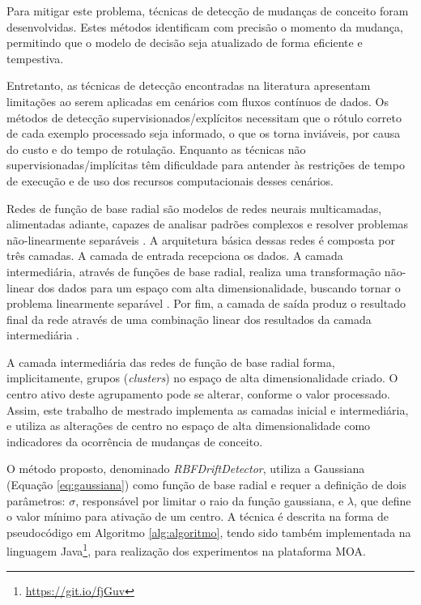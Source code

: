 \documentclass[qual, classic, a4paper]{ufbathesis}
\begin{document}
Para mitigar este problema, técnicas de detecção de mudanças de conceito foram desenvolvidas. 
Estes métodos identificam com precisão o momento da mudança, permitindo que o modelo de decisão seja atualizado de forma eficiente e tempestiva.

Entretanto, as técnicas de detecção encontradas na literatura apresentam limitações ao serem aplicadas em cenários com fluxos contínuos de dados.
Os métodos de detecção supervisionados/explícitos necessitam que o rótulo correto de cada exemplo processado seja informado, o que os torna inviáveis, por causa do custo e do tempo de rotulação.
Enquanto as técnicas não supervisionadas/implícitas têm dificuldade para antender às restrições de tempo de execução e de uso dos recursos computacionais desses cenários.

Redes de função de base radial são modelos de redes neurais multicamadas, alimentadas adiante, capazes de analisar padrões complexos e resolver problemas não-linearmente separáveis \cite{Braga:RedesNeuraisTeoriaAplicacoes}.
A arquitetura básica dessas redes é composta por três camadas.
A camada de entrada recepciona os dados.
A camada intermediária, através de funções de base radial, realiza uma transformação não-linear dos dados para um espaço com alta dimensionalidade, buscando tornar o problema linearmente separável \cite{cover1965browse}.
Por fim, a camada de saída produz o resultado final da rede através de uma combinação linear dos resultados da camada intermediária \cite{Rojas:1996:NNS:235222}.

A camada intermediária das redes de função de base radial forma, implicitamente, grupos (\textit{clusters}) no espaço de alta dimensionalidade criado.
O centro ativo deste agrupamento pode se alterar, conforme o valor processado.
Assim, este trabalho de mestrado implementa as camadas inicial e intermediária, 
e utiliza as alterações de centro no espaço de alta dimensionalidade como indicadores da ocorrência de mudanças de conceito.

O método proposto, denominado \textit{RBFDriftDetector}, utiliza a Gaussiana (Equação \ref{eq:gaussiana}) como função de base radial e requer a definição de dois parâmetros: 
\textit{$\sigma$}, responsável por limitar o raio da função gaussiana, e \textit{$\lambda$}, que define o valor mínimo para ativação de um centro.
A técnica é descrita na forma de pseudocódigo em Algoritmo \ref{alg:algoritmo}, 
tendo sido também implementada na linguagem Java\footnote{\url{https://git.io/fjGuv}}, para realização dos experimentos na plataforma MOA.
\end{document}
